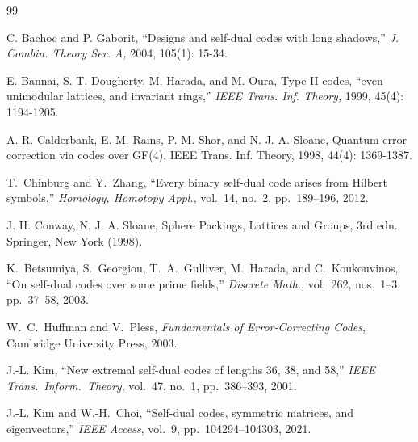 \documentclass[12pt]{article}
\begin{document}

\begin{thebibliography}{99}



 C. Bachoc and P. Gaborit, ``Designs and self-dual codes with long shadows,'' \textit{J. Combin.
Theory Ser. A,} 2004, 105(1): 15-34.

 E. Bannai, S. T. Dougherty, M. Harada, and M. Oura, Type II codes, ``even unimodular
lattices, and invariant rings,'' \textit{IEEE Trans. Inf. Theory,} 1999, 45(4): 1194-1205.

A. R. Calderbank, E. M. Rains, P. M. Shor, and N. J. A. Sloane, Quantum error
correction via codes over GF(4), IEEE Trans. Inf. Theory, 1998, 44(4): 1369-1387.


T.~Chinburg and Y.~Zhang,
``Every binary self-dual code arises from Hilbert symbols,''
\textit{Homology, Homotopy Appl.}, vol.~14, no.~2, pp.~189--196, 2012.


J. H. Conway, N. J. A. Sloane, Sphere Packings, Lattices and Groups, 3rd edn.
Springer, New York (1998).

K.~Betsumiya, S.~Georgiou, T.~A.~Gulliver, M.~Harada, and C.~Koukouvinos,
``On self-dual codes over some prime fields,''
\textit{Discrete Math.}, vol.~262, nos.~1--3, pp.~37--58, 2003.





W.~C.~Huffman and V.~Pless,
\textit{Fundamentals of Error-Correcting Codes},
Cambridge University Press, 2003.


J.-L. Kim,
``New extremal self-dual codes of lengths 36, 38, and 58,''
\textit{IEEE Trans.\ Inform.\ Theory}, vol.~47, no.~1, pp.~386--393, 2001.

J.-L. Kim and W.-H.~Choi,
``Self-dual codes, symmetric matrices, and eigenvectors,''
\textit{IEEE Access}, vol.~9, pp.~104294--104303, 2021.


\end{thebibliography}
\end{document}
